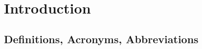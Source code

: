 
\newcommand{\sourcepath}{1Introduction/src/}

\section{Introduction}


\subsection{Definitions, Acronyms, Abbreviations}






\newpage
